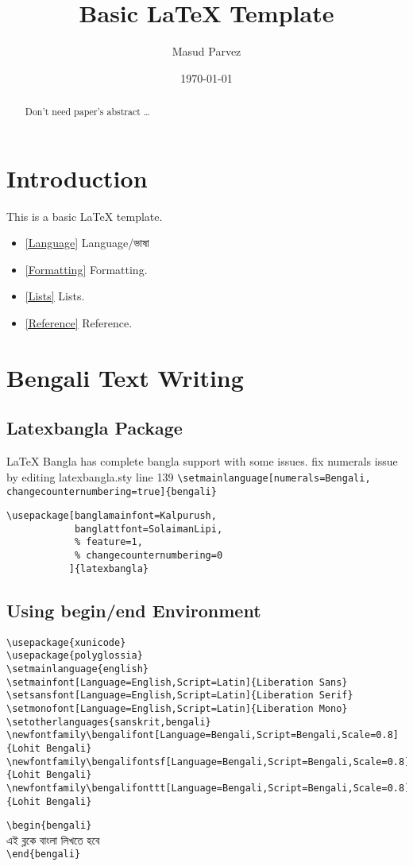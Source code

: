 \documentclass[10pt]{article}
\author{ Masud Parvez }
\title{Basic \LaTeX{}  Template}
\date{\today}
\begin{document}
\maketitle

\begin{abstract}
Don't need paper's abstract \ldots
\end{abstract}

\section{Introduction}
This is a basic \LaTeX{} template.\\

\begin{itemize}
\item \ref{Language} Language/ভাষা
\item \ref{Formatting} Formatting.
\item \ref{Lists} Lists.
\item \ref{Reference} Reference.
\end{itemize}

\section{Bengali Text Writing\label{Language}}
\subsection{Latexbangla Package }
\LaTeX{} Bangla has complete bangla support
with some issues.
fix numerals issue by editing latexbangla.sty
line 139 \verb|\setmainlanguage[numerals=Bengali, changecounternumbering=true]{bengali}|

\begin{verbatim}
\usepackage[banglamainfont=Kalpurush,
            banglattfont=SolaimanLipi,
            % feature=1,
            % changecounternumbering=0
           ]{latexbangla}
\end{verbatim}

\subsection{Using begin/end Environment}
\begin{verbatim}
\usepackage{xunicode}
\usepackage{polyglossia}
\setmainlanguage{english}
\setmainfont[Language=English,Script=Latin]{Liberation Sans}
\setsansfont[Language=English,Script=Latin]{Liberation Serif}
\setmonofont[Language=English,Script=Latin]{Liberation Mono}
\setotherlanguages{sanskrit,bengali}
\newfontfamily\bengalifont[Language=Bengali,Script=Bengali,Scale=0.8]{Lohit Bengali}
\newfontfamily\bengalifontsf[Language=Bengali,Script=Bengali,Scale=0.8]{Lohit Bengali}
\newfontfamily\bengalifonttt[Language=Bengali,Script=Bengali,Scale=0.8]{Lohit Bengali}
\end{verbatim}
\verb|\begin{bengali}|
\\
এই ব্লকে বাংলা লিখতে হবে
\\
\verb|\end{bengali}|
\end{document}
